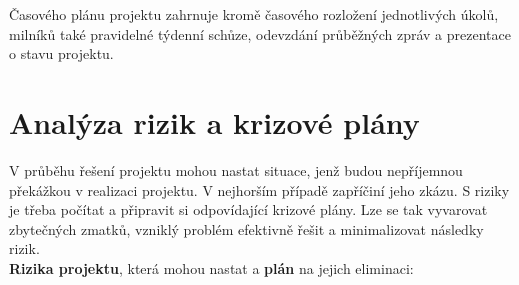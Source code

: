 \documentclass[12pt,a4paper]{article}
\begin{document}
Časového plánu projektu zahrnuje kromě časového rozložení jednotlivých úkolů, milníků také pravidelné týdenní schůze, odevzdání průběžných zpráv a prezentace o stavu projektu. 


\section*{Analýza rizik a krizové plány}
V průběhu řešení projektu mohou nastat situace, jenž budou nepříjemnou překážkou v realizaci projektu. V nejhorším případě zapříčiní jeho zkázu. S riziky je třeba počítat a připravit si odpovídající krizové plány. Lze se tak vyvarovat zbytečných zmatků, vzniklý problém efektivně řešit a minimalizovat následky rizik. \\

\noindent \textbf{Rizika projektu}, která mohou nastat a \textbf{plán} na jejich eliminaci: 
\end{document}
